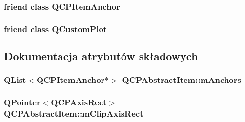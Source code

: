 \subsubsection[{\texorpdfstring{Q\+C\+P\+Item\+Anchor}{QCPItemAnchor}}]{\setlength{\rightskip}{0pt plus 5cm}friend class {\bf Q\+C\+P\+Item\+Anchor}\hspace{0.3cm}{\ttfamily [friend]}}\hypertarget{class_q_c_p_abstract_item_a61767d414fd57af9eb1741b34268c7fc}{}\label{class_q_c_p_abstract_item_a61767d414fd57af9eb1741b34268c7fc}
\subsubsection[{\texorpdfstring{Q\+Custom\+Plot}{QCustomPlot}}]{\setlength{\rightskip}{0pt plus 5cm}friend class {\bf Q\+Custom\+Plot}\hspace{0.3cm}{\ttfamily [friend]}}\hypertarget{class_q_c_p_abstract_item_a1cdf9df76adcfae45261690aa0ca2198}{}\label{class_q_c_p_abstract_item_a1cdf9df76adcfae45261690aa0ca2198}


\subsection{Dokumentacja atrybutów składowych}
\subsubsection[{\texorpdfstring{m\+Anchors}{mAnchors}}]{\setlength{\rightskip}{0pt plus 5cm}Q\+List$<${\bf Q\+C\+P\+Item\+Anchor}$\ast$$>$ Q\+C\+P\+Abstract\+Item\+::m\+Anchors\hspace{0.3cm}{\ttfamily [protected]}}\hypertarget{class_q_c_p_abstract_item_a909a3abab783de302ebf0a0e6f2bbc15}{}\label{class_q_c_p_abstract_item_a909a3abab783de302ebf0a0e6f2bbc15}
\subsubsection[{\texorpdfstring{m\+Clip\+Axis\+Rect}{mClipAxisRect}}]{\setlength{\rightskip}{0pt plus 5cm}Q\+Pointer$<${\bf Q\+C\+P\+Axis\+Rect}$>$ Q\+C\+P\+Abstract\+Item\+::m\+Clip\+Axis\+Rect\hspace{0.3cm}{\ttfamily [protected]}}\hypertarget{class_q_c_p_abstract_item_a3e57cfe7da4b1ac3d6fa7281ea437361}{}\label{class_q_c_p_abstract_item_a3e57cfe7da4b1ac3d6fa7281ea437361}
